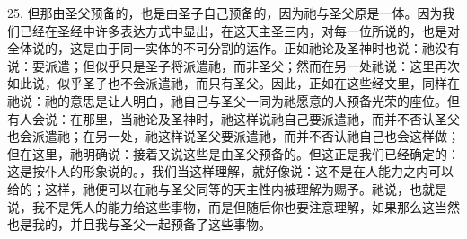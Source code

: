 25. 但那由圣父预备的，也是由圣子自己预备的，因为祂与圣父原是一体。因为我们已经在圣经中许多表达方式中显出，在这天主圣三内，对每一位所说的，也是对全体说的，这是由于同一实体的不可分割的运作。正如祂论及圣神时也说：祂没有说：要派遣；但似乎只是圣子将派遣祂，而非圣父；然而在另一处祂说：这里再次如此说，似乎圣子也不会派遣祂，而只有圣父。因此，正如在这些经文里，同样在祂说：祂的意思是让人明白，祂自己与圣父一同为祂愿意的人预备光荣的座位。但有人会说：在那里，当祂论及圣神时，祂这样说祂自己要派遣祂，而并不否认圣父也会派遣祂；在另一处，祂这样说圣父要派遣祂，而并不否认祂自己也会这样做；但在这里，祂明确说：接着又说这些是由圣父预备的。但这正是我们已经确定的：这是按仆人的形象说的。，我们当这样理解，就好像说：这不是在人能力之内可以给的；这样，祂便可以在祂与圣父同等的天主性内被理解为赐予。祂说，也就是说，我不是凭人的能力给这些事物，而是但随后你也要注意理解，如果那么这当然也是我的，并且我与圣父一起预备了这些事物。\par

